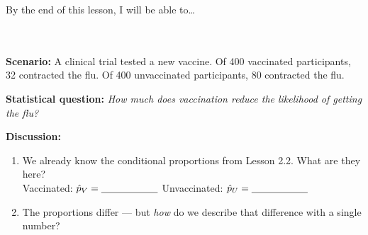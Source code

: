 \documentclass[10pt]{article}
\begin{document}
\namedateperiod

\vspace{0.12in}

\begin{objectivebox}
\small By the end of this lesson, I will be able to\dots\\[4pt]
\writeline\\[1pt]
\writeline\\[1pt]
\writeline
\end{objectivebox}

\vspace{0.1in}

\begin{vocabbox}
\end{vocabbox}

\vspace{0.1in}

\begin{hookbox}
\small\textbf{Scenario:} A clinical trial tested a new vaccine. Of 400 vaccinated participants,
32 contracted the flu. Of 400 unvaccinated participants, 80 contracted the flu.

\vspace{6pt}
\textbf{Statistical question:} \textit{How much does vaccination reduce the likelihood of getting the flu?}

\vspace{6pt}
\textbf{Discussion:}
\begin{enumerate}[leftmargin=1.5em, itemsep=2pt]
  \item We already know the conditional proportions from Lesson 2.2. What are they here?\\
        Vaccinated: $\hat{p}_V = \blank{2cm}$ \quad Unvaccinated: $\hat{p}_U = \blank{2cm}$
  \item The proportions differ --- but \emph{how} do we describe that difference with a single number?\\
        \writeline
\end{enumerate}
\end{hookbox}
\end{document}
